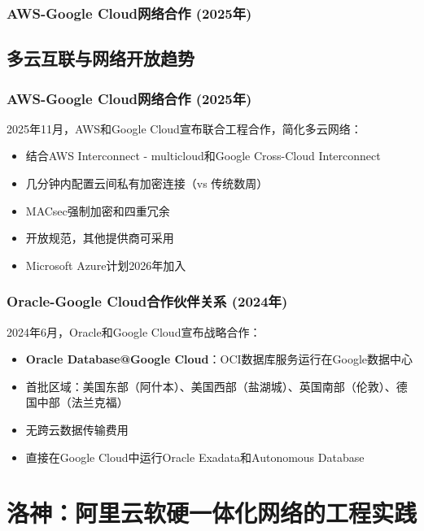 \subsubsection{AWS-Google Cloud网络合作 (2025年)}



\subsection{多云互联与网络开放趋势}

\subsubsection{AWS-Google Cloud网络合作 (2025年)}

2025年11月，AWS和Google Cloud宣布联合工程合作，简化多云网络：

\begin{itemize}
    \item 结合AWS Interconnect - multicloud和Google Cross-Cloud Interconnect
    \item 几分钟内配置云间私有加密连接（vs 传统数周）
    \item MACsec强制加密和四重冗余
    \item 开放规范，其他提供商可采用
    \item Microsoft Azure计划2026年加入
\end{itemize}

\subsubsection{Oracle-Google Cloud合作伙伴关系 (2024年)}

2024年6月，Oracle和Google Cloud宣布战略合作：

\begin{itemize}
    \item \textbf{Oracle Database@Google Cloud}：OCI数据库服务运行在Google数据中心
    \item 首批区域：美国东部（阿什本）、美国西部（盐湖城）、英国南部（伦敦）、德国中部（法兰克福）
    \item 无跨云数据传输费用
    \item 直接在Google Cloud中运行Oracle Exadata和Autonomous Database
\end{itemize}

\section{洛神：阿里云软硬一体化网络的工程实践}

